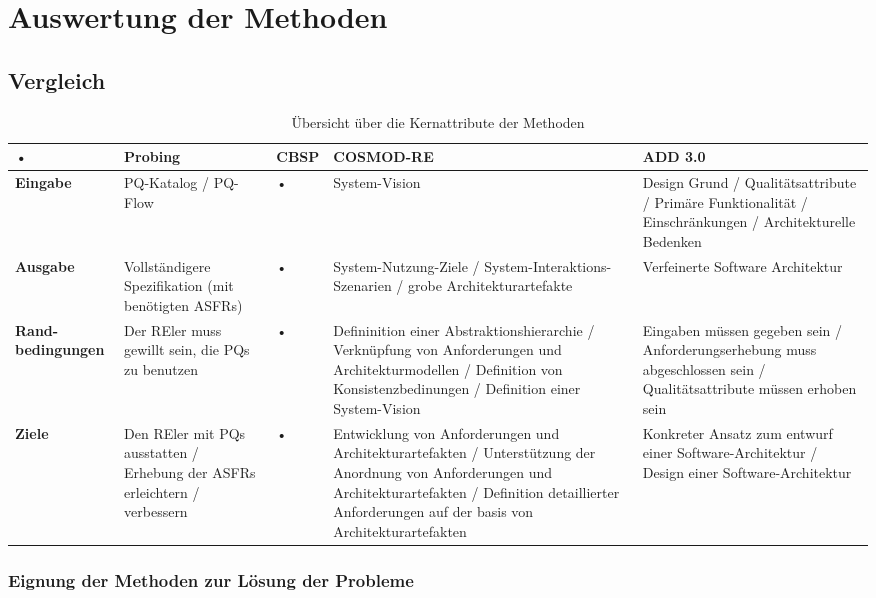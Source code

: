 \section{Auswertung der Methoden}

\subsection{Vergleich}

\begin{table*}[h]
\caption{Übersicht über die Kernattribute der Methoden}
\centering
\begin{tabular}{|p{}|p{}|p{}|p{}|p{}|}%
\hline 
\rule[-1ex]{0pt}{2.5ex} • & \textbf{Probing} &  \textbf{CBSP} & \textbf{COSMOD-RE} & \textbf{ADD 3.0} \\ 
\hline 
\rule[-1ex]{0pt}{2.5ex}  \textbf{Eingabe} &  PQ-Katalog / PQ-Flow & • &  System-Vision & Design Grund / Qualitätsattribute / Primäre Funktionalität / Einschränkungen / Architekturelle Bedenken \\ 
\hline 
\rule[-1ex]{0pt}{2.5ex} \textbf{Ausgabe} & Vollständigere Spezifikation (mit benötigten ASFRs) & • &  System-Nutzung-Ziele / System-Interaktions-Szenarien / grobe Architekturartefakte &  Verfeinerte Software Architektur \\ 
\hline 
\rule[-1ex]{0pt}{2.5ex}  \textbf{Rand-bedingungen} &  Der REler muss gewillt sein, die PQs zu benutzen & • &  Defininition einer Abstraktionshierarchie / Verknüpfung von Anforderungen und Architekturmodellen / Definition von Konsistenzbedinungen / Definition einer System-Vision &  Eingaben müssen gegeben sein / Anforderungserhebung muss abgeschlossen sein / Qualitätsattribute müssen erhoben sein \\ 
\hline 
\rule[-1ex]{0pt}{2.5ex}  \textbf{Ziele} &  Den REler mit PQs ausstatten / Erhebung der ASFRs erleichtern / verbessern & • &  Entwicklung von Anforderungen und Architekturartefakten / Unterstützung der Anordnung von Anforderungen und Architekturartefakten / Definition detaillierter Anforderungen auf der basis von Architekturartefakten &  Konkreter Ansatz zum entwurf einer Software-Architektur / Design einer Software-Architektur \\ 
\hline 
\end{tabular} 
\label{tab:method_rating}
\end{table*}


\subsubsection{Eignung der Methoden zur Lösung der Probleme}

